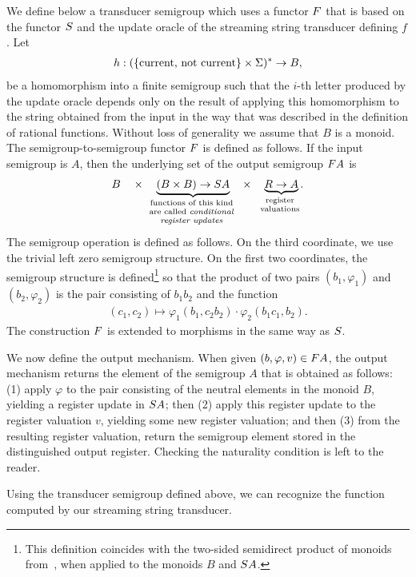 We define below a transducer semigroup which uses a functor $\functor$ that is based on the functor $\functors$ and the update oracle of the streaming string transducer defining $f$.  Let 
\begin{align*}
h : (\{\text{current, not current}\} \times \Sigma)^* \to B,
\end{align*}
be a homomorphism into a finite semigroup such that the $i$-th letter produced by the update oracle depends only on the result of applying this homomorphism to the string obtained from the input in the way that was described in the definition of rational functions. Without loss of generality we assume that $B$ is a monoid. The semigroup-to-semigroup functor $\functor$ is defined as follows. If the input semigroup is $A$, then the underlying set of the output semigroup $\functor A$ is 
\begin{align*}
     B \quad \times \quad \myunderbrace{(B \times B) \to \functors A}{functions of this kind\\ are  called \emph{conditional} \\\emph{register updates}} 
\quad \times \quad \myunderbrace{R \to A}{register\\ valuations}.
\end{align*}
The semigroup operation is defined as follows. On the third coordinate, we use the trivial left zero semigroup structure. On the first two coordinates, the semigroup structure is defined\footnote{This definition coincides with the two-sided semidirect product of monoids from~\cite[Section 6]{rhodes1989kernel}, when applied to the monoids $B$ and $\functors A$.} so that the product of two pairs $(b_1,\varphi_1)$ and $(b_2,\varphi_2)$ is  the pair consisting of $b_1 b_2$ and the function  
\begin{align*}
(c_1,c_2)  \mapsto   \varphi_1(b_1,c_2b_2) \cdot \varphi_2(b_1c_1,b_2).
\end{align*}
The construction $\functor$ is extended to morphisms in the same way as $\functors$. 

We now define the  output mechanism. When given $(b,\varphi,v) \in \functor A$, the output mechanism returns the element of the semigroup $A$ that  is obtained as follows:  (1) apply  $\varphi$ to the pair consisting of the neutral elements in the monoid $B$, yielding a register update in $\functors A$; then (2) apply this  register update to the register valuation $v$,  yielding some new register valuation; and then (3) from the resulting register valuation, return the semigroup element stored in the distinguished output register.  Checking the naturality condition is left to the reader.

Using the transducer semigroup defined above, we can recognize the function  computed by our streaming string transducer. 
